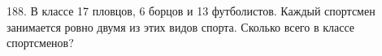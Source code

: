 188. В классе 17 пловцов, 6 борцов и 13 футболистов. Каждый спортсмен занимается ровно двумя из этих видов спорта. Сколько всего в классе спортсменов?\\
